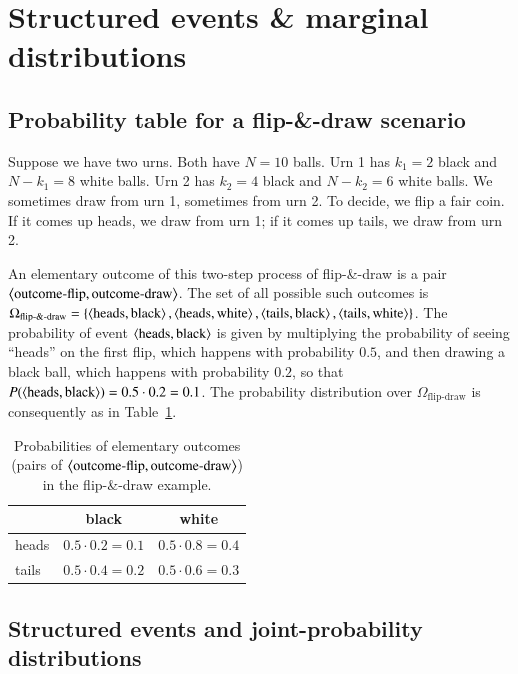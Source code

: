 \documentclass[nobib,nofonts]{tufte-handout}
\newcommand{\mult}{\ensuremath{\cdot}}
\begin{document}
\section{Structured events \& marginal distributions}

\subsection{Probability table for a flip-\&-draw scenario}

Suppose we have two urns. Both have $N=10$ balls. Urn 1 has $k_1=2$ black and $N-k_1 = 8$ white
balls. Urn 2 has $k_2=4$ black and $N-k_2=6$ white balls. We sometimes draw from urn 1,
sometimes from urn 2. To decide, we flip a fair coin. If it comes up heads, we draw from urn 1;
if it comes up tails, we draw from urn 2.

An elementary outcome of this two-step process of flip-\&-draw is a pair
$\left \langle \text{outcome-flip}, \text{outcome-draw}\right\rangle$. The set of all possible such outcomes is
$\Omega_{\text{flip-\&-draw}} = \left\{\left \langle \text{heads}, \text{black}\right\rangle, \left \langle \text{heads},
    \text{white}\right\rangle, \left \langle \text{tails}, \text{black}\right\rangle, \left \langle \text{tails},
    \text{white}\right\rangle\right\}$. The probability of event $\left \langle \text{heads}, \text{black}\right\rangle$ is given by
multiplying the probability of seeing ``heads'' on the first flip, which happens with
probability $0.5$, and then drawing a black ball, which happens with probability $0.2$, so that
$P(\left \langle \text{heads}, \text{black}\right\rangle) = 0.5 \cdot 0.2 = 0.1$. The probability distribution
over $\Omega_{\text{flip-draw}}$ is consequently as in
Table~\ref{tab:flip-and-draw:probabilities}.
%
\begin{table}
  \centering
  \begin{tabular}{lcc}
    & black & white \\ \midrule
    heads & $0.5 \mult 0.2 = 0.1$  & $0.5 \mult 0.8 = 0.4$ \\
    tails & $0.5 \mult 0.4 = 0.2$  & $0.5 \mult 0.6 = 0.3$
  \end{tabular}
  \caption{Probabilities of elementary outcomes (pairs of $\left \langle \text{outcome-flip},
      \text{outcome-draw}\right\rangle$) in the flip-\&-draw example.}
  \label{tab:flip-and-draw:probabilities}
\end{table}

\subsection{Structured events and joint-probability distributions}
\end{document}
